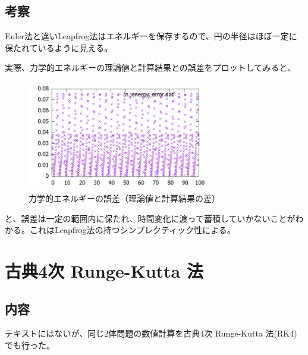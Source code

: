 \documentclass[a4paper,twoside]{jarticle}
\begin{document}
\subsection{考察}
Euler法と違いLeapfrog法はエネルギーを保存するので、円の半径はほぼ一定に保たれているように見える。

実際、力学的エネルギーの理論値と計算結果との誤差をプロットしてみると、

\begin{figure}[H]
\begin{center}
\includegraphics[width=8cm]{../cpp/out/leap-frog/n_error.png}
\end{center}
\caption{力学的エネルギーの誤差（理論値と計算結果の差）}
\end{figure}

と、誤差は一定の範囲内に保たれ、時間変化に渡って蓄積していかないことがわかる。これはLeapfrog法の持つシンプレクティック性による。

\section{古典4次 Runge-Kutta 法}
\subsection{内容}
テキストにはないが、同じ2体問題の数値計算を古典4次 Runge-Kutta 法(RK4)でも行った。
\end{document}
